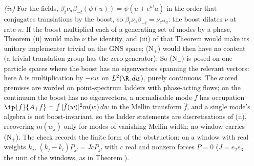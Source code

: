 \emph{(iv)} For the fields, $\beta_{t}\nu_{a}\beta_{-t}(\psi(u)) = \psi(u + e^{\kappa t}a)$ in the order that conjugates translations by the boost, so $\beta_{t}\nu_{a}\beta_{-t} = \nu_{e^{\kappa t}a}$: the boost dilates $\nu$ at rate $\kappa$. If the boost multiplied each of a generating set of modes by a phase, Theorem (ii) would make $\nu$ the identity, and (iii) of that Theorem would make its unitary implementer trivial on the GNS space; (N$_{+}$) would then have no content (a trivial translation group has the zero generator). So (N$_{+}$) is posed on one-particle spaces where the boost has no eigenvectors spanning the relevant vectors: here $h$ is multiplication by $-\kappa w$ on $L^{2}(\R, dw)$, purely continuous. The stored premises are worded on point-spectrum ladders with phase-acting flows; on the continuum the boost has no eigenvectors, a normalisable mode $f$ has occupation $\ip{f}{A_{+}f} = \int|\hat f(w)|^{2}m(w)\,dw$ in the Mellin transform $\hat f$, and a single mode's algebra is not boost-invariant, so the ladder statements are discretisations of (ii), recovering $m(w_{j})$ only for modes of vanishing Mellin width; no window carries (N$_{+}$). The check records the finite form of the obstruction: on a window with real weights $k_{j}$, $(k_{j} - k_{l})P_{jl} = JcP_{jl}$ with $c$ real and nonzero forces $P = 0$ ($J = e_{2}e_{3}$ the unit of the windows, as in Theorem ).


